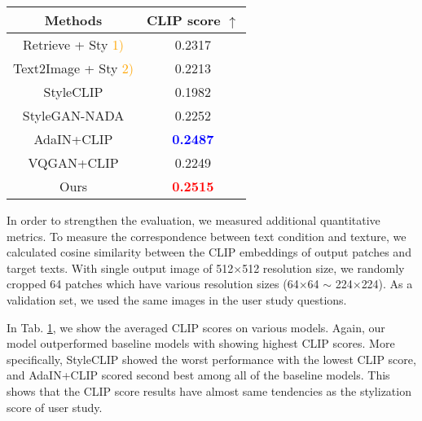 \documentclass[10pt,twocolumn,letterpaper]{article}
\begin{document}
\begin{table}[!t]
\vspace{-0.2cm}

		\centering
		\begin{adjustbox}{width=0.3\textwidth}
		\begin{tabular}[b]{c|c}
        \textbf{Methods}&\textbf{CLIP score $\uparrow$}\\
        \hline
      Retrieve + Sty \textcolor{orange}{1)} & 0.2317\\
      Text2Image + Sty \textcolor{orange}{2)} &0.2213 \\
      \hdashline
      StyleCLIP &  0.1982\\
      StyleGAN-NADA &0.2252\\
      \hdashline
      AdaIN+CLIP & \textcolor{blue}{\textbf{0.2487}}\\
      VQGAN+CLIP & 0.2249\\
      \hdashline
      Ours &\textcolor{red}{\textbf{0.2515}} \\
    \hline
    \end{tabular}
    \end{adjustbox}

	\label{tab:clip}
\end{table}

In order to strengthen the evaluation, we measured additional quantitative metrics. To measure the correspondence between text condition and texture, we calculated cosine similarity between the CLIP embeddings of output patches and target texts. With single output image of 512$\times$512 resolution size, we randomly cropped 64 patches which have various resolution sizes (64$\times$64 $\sim$ 224$\times$224). As a validation set, we used the same images in the user study questions.

In Tab. \ref{tab:clip}, we show the averaged CLIP scores on various models.  Again, our model outperformed baseline models with showing highest CLIP scores. More specifically, StyleCLIP showed the worst performance with the lowest CLIP score, and AdaIN+CLIP scored second best among all of the baseline models. This shows that the CLIP score results have almost same tendencies as the stylization score of user study.
\end{document}
